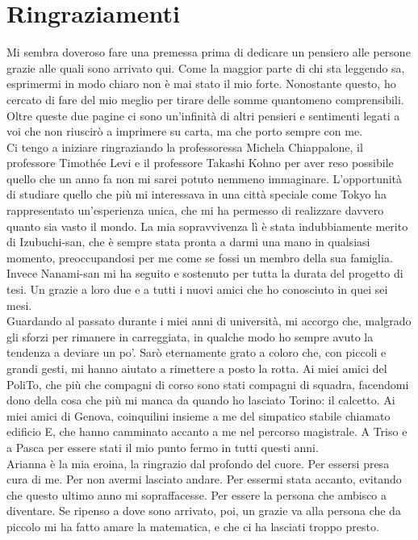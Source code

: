 \chapter*{Ringraziamenti}

Mi sembra doveroso fare una premessa prima di dedicare un pensiero alle persone grazie alle quali sono arrivato qui. Come la maggior parte di chi sta leggendo sa, esprimermi in modo chiaro non è mai stato il mio forte. Nonostante questo, ho cercato di fare del mio meglio per tirare delle somme quantomeno comprensibili. Oltre queste due pagine ci sono un’infinità di altri pensieri e sentimenti legati a voi che non riuscirò a imprimere su carta, ma che porto sempre con me.\\

Ci tengo a iniziare ringraziando la professoressa Michela Chiappalone, il professore Timothée Levi e il professore Takashi Kohno per aver reso possibile quello che un anno fa non mi sarei potuto nemmeno immaginare. L’opportunità di studiare quello che più mi interessava in una città speciale come Tokyo ha rappresentato un’esperienza unica, che mi ha permesso di realizzare davvero quanto sia vasto il mondo.
La mia sopravvivenza lì è stata indubbiamente merito di Izubuchi-san, che è sempre stata pronta a darmi una mano in qualsiasi momento, preoccupandosi per me come se fossi un membro della sua famiglia. Invece Nanami-san mi ha seguito e sostenuto per tutta la durata del progetto di tesi. Un grazie a loro due e a tutti i nuovi amici che ho conosciuto in quei sei mesi.\\

Guardando al passato durante i miei anni di università, mi accorgo che, malgrado gli sforzi per rimanere in carreggiata, in qualche modo ho sempre avuto la tendenza a deviare un po'. Sarò eternamente grato a coloro che, con piccoli e grandi gesti, mi hanno aiutato a rimettere a posto la rotta. Ai miei amici del PoliTo, che più che compagni di corso sono stati compagni di squadra, facendomi dono della cosa che più mi manca da quando ho lasciato Torino: il calcetto. Ai miei amici di Genova, coinquilini insieme a me del simpatico stabile chiamato edificio E, che hanno camminato accanto a me nel percorso magistrale. A Triso e a Pasca per essere stati il mio punto fermo in tutti questi anni.\\
Arianna è la mia eroina, la ringrazio dal profondo del cuore. Per essersi presa cura di me. Per non avermi lasciato andare. Per essermi stata accanto, evitando che questo ultimo anno mi sopraffacesse. Per essere la persona che ambisco a diventare. Se ripenso a dove sono arrivato, poi, un grazie va alla persona che da piccolo mi ha fatto amare la matematica, e che ci ha lasciati troppo presto.\\

